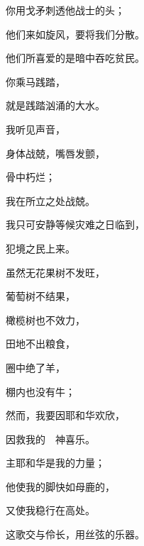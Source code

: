 {\Q {}你用{}戈矛刺透他战士的头；
\par }{\Q 他们来如旋风，要将我们分散。
\par }{\Q 他们所喜爱的是暗中吞吃贫民。
\par }{\Q {}你乘马践踏{}，
\par }{\Q 就是践踏汹涌的大水。
\par }{\BB \par }{\Q {}我听见{}声音，
\par }{\Q 身体战兢，嘴唇发颤，
\par }{\Q 骨中朽烂；
\par }{\Q 我在所立之处战兢。
\par }{\Q 我只可安静等候灾难之日临到，
\par }{\Q 犯境之民上来。
\par }{\BB \par }{\Q {}虽然无花果树不发旺，
\par }{\Q 葡萄树不结果，
\par }{\Q 橄榄树也不效力，
\par }{\Q 田地不出粮食，
\par }{\Q 圈中绝了羊，
\par }{\Q 棚内也没有牛；
\par }{\Q {}然而，我要因耶和华欢欣，
\par }{\Q 因救我的　神喜乐。
\par }{\Q {}主耶和华是我的力量；
\par }{\Q 他使我的脚快如母鹿的{}，
\par }{\Q 又使我稳行在高处。
\par }{\BB \par }{\Q 这歌交与伶长，用丝弦的乐器。
\par }